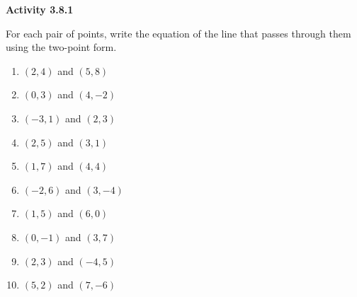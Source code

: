  \vspace{1ex}
\noindent\textbf{Activity 3.8.1}

\vspace{0.75ex}

For each pair of points, write the equation of the line that passes through them using the two-point form.
\begin{multicols}{2}
\begin{enumerate}[noitemsep, label = \color{blue}\arabic*. ]
    \item $(2, 4)$ and $(5, 8)$
    \item $(0, 3)$ and $(4, -2)$
    \item $(-3, 1)$ and $(2, 3)$
    \item $(2, 5)$ and $(3, 1)$
    \item $(1, 7)$ and $(4, 4)$
    \item $(-2, 6)$ and $(3, -4)$
    \item $(1, 5)$ and $(6, 0)$
    \item $(0, -1)$ and $(3, 7)$
    \item $(2, 3)$ and $(-4, 5)$
    \item $(5, 2)$ and $(7, -6)$
\end{enumerate}
\end{multicols}

